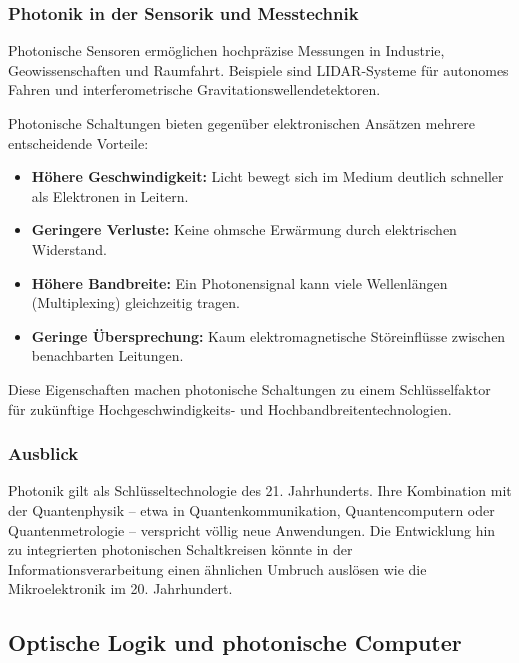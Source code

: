 \subsubsection{Photonik in der Sensorik und Messtechnik}

Photonische Sensoren ermöglichen hochpräzise Messungen in Industrie, Geowissenschaften und Raumfahrt.  
Beispiele sind LIDAR-Systeme für autonomes Fahren und interferometrische Gravitationswellendetektoren.

\medskip
\begin{tcolorbox}[physikbox, title=Photonische Schaltungen vs. Elektronische Schaltungen \label{box:photon_vs_electron}]
	\small
	Photonische Schaltungen bieten gegenüber elektronischen Ansätzen mehrere entscheidende Vorteile:
	\begin{itemize}
		\item \textbf{Höhere Geschwindigkeit:} Licht bewegt sich im Medium deutlich schneller als Elektronen in Leitern.
		\item \textbf{Geringere Verluste:} Keine ohmsche Erwärmung durch elektrischen Widerstand.
		\item \textbf{Höhere Bandbreite:} Ein Photonensignal kann viele Wellenlängen (Multiplexing) gleichzeitig tragen.
		\item \textbf{Geringe Übersprechung:} Kaum elektromagnetische Störeinflüsse zwischen benachbarten Leitungen.
	\end{itemize}
	Diese Eigenschaften machen photonische Schaltungen zu einem Schlüsselfaktor für zukünftige Hochgeschwindigkeits- und Hochbandbreitentechnologien.
\end{tcolorbox}

\subsubsection{Ausblick}

Photonik gilt als Schlüsseltechnologie des 21. Jahrhunderts. Ihre Kombination mit der Quantenphysik – etwa in Quantenkommunikation, Quantencomputern oder Quantenmetrologie – verspricht völlig neue Anwendungen.  
Die Entwicklung hin zu integrierten photonischen Schaltkreisen könnte in der Informationsverarbeitung einen ähnlichen Umbruch auslösen wie die Mikroelektronik im 20. Jahrhundert.

\subsection{Optische Logik und photonische Computer}

